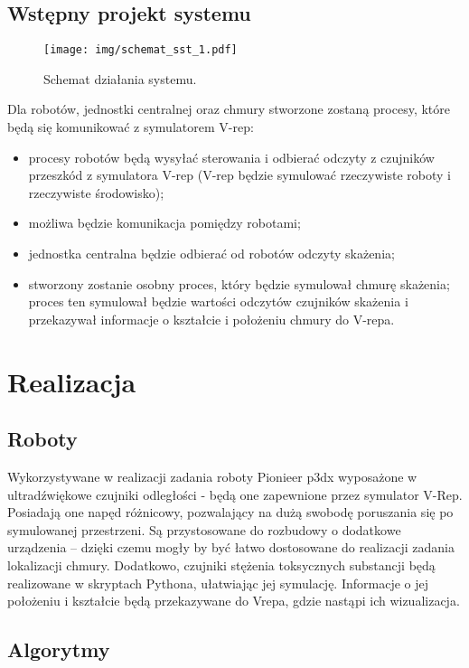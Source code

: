 \documentclass[a4paper, 12pt]{article}
\begin{document}
	
	
		
	

	
	\clearpage
	\subsection{Wstępny projekt systemu}	
	\begin{figure}[h!]
		\centering
		\texttt{[image: img/schemat\_sst\_1.pdf]}
		\caption{Schemat działania systemu.}
	\end{figure}
	Dla robotów, jednostki centralnej oraz chmury stworzone zostaną procesy, które będą się komunikować z symulatorem V-rep:
	\begin{itemize}
		\item procesy robotów będą wysyłać sterowania i odbierać odczyty z czujników przeszkód z symulatora V-rep (V-rep będzie symulować rzeczywiste roboty i rzeczywiste środowisko);
		\item możliwa będzie komunikacja pomiędzy robotami;
		\item jednostka centralna będzie odbierać od robotów odczyty skażenia;
		\item stworzony zostanie osobny proces, który będzie symulował chmurę skażenia; proces ten symulował będzie wartości odczytów czujników skażenia i przekazywał informacje o kształcie i położeniu chmury do V-repa.
	\end{itemize}
	
	\section{Realizacja}
	
	\subsection{Roboty}
	Wykorzystywane w realizacji zadania roboty Pionieer p3dx wyposażone w ultradźwiękowe czujniki odległości - będą one zapewnione przez symulator V-Rep. Posiadają one napęd różnicowy, pozwalający na dużą swobodę poruszania się po symulowanej przestrzeni. Są przystosowane do rozbudowy o dodatkowe urządzenia -- dzięki czemu mogły by być łatwo dostosowane do realizacji zadania lokalizacji chmury.
	Dodatkowo, czujniki stężenia toksycznych substancji będą realizowane w skryptach Pythona, ułatwiając jej symulację. Informacje o jej położeniu i kształcie będą przekazywane do Vrepa, gdzie nastąpi ich wizualizacja.
	\subsection{Algorytmy}
	
\end{document}
